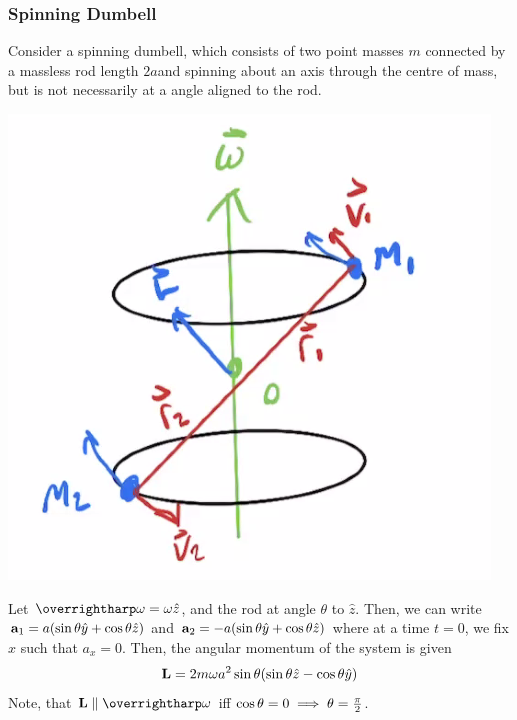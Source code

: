 \subsubsection{Spinning Dumbell}
Consider a spinning dumbell, which consists of two point masses \(m\) connected by a massless rod length \(2a\)and spinning about an axis through the centre of mass, but is not necessarily at a angle aligned to the rod.
\begin{center}
	\includegraphics[scale = 0.5]{lwcounter.png}
\end{center}

Let \(\vv\omega = \omega\hat z\), and the rod at angle \(\theta\) to \(\hat z\). Then, we can write \(\mathbf{a}_1 = a(\sin\theta\hat y + \cos\theta\hat z)\) and \(\mathbf{a}_2 = -a(\sin\theta\hat y + \cos\theta\hat z)\) where at a time \(t=0\), we fix \(x\) such that \(a_x=0\). Then, the angular momentum of the system is given
\[\mathbf{L} = 2m\omega a^2\sin\theta(\sin\theta\hat z- \cos\theta \hat y)\]
Note, that \(\vb L\parallel \vv \omega\) iff \(\cos\theta = 0\implies\theta = \frac{\pi}{2}\).

